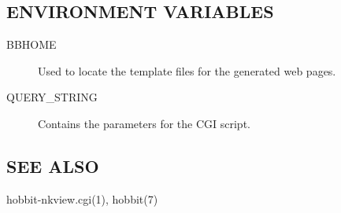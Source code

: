 \subsection{ENVIRONMENT VARIABLES}
\begin{description}
\item[BBHOME] Used to locate the template files for the generated web pages. 


\item[QUERY\_STRING] Contains the parameters for the CGI script. 

\end{description}
\subsection{SEE ALSO}
hobbit-nkview.cgi(1), hobbit(7) 


